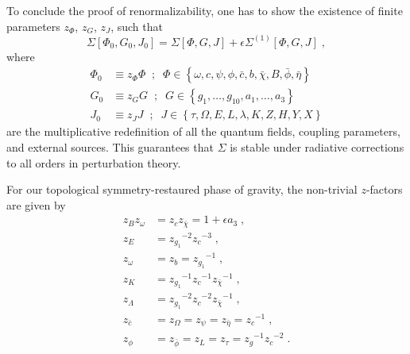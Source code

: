 \documentclass[../main.tex]{subfiles}
\begin{document}
To conclude the proof of renormalizability, one has to show the existence of finite parameters $ z_{ \Phi } $, $ z_{ G } $, $ z_{ J } $, such that
\begin{equation}
  \label{eq:multiplicative-renorm}
  \Sigma \left[ \Phi_0, G_0, J_0 \right] = \Sigma \left[ \Phi, G, J \right] + \epsilon\Sigma^{ (1) } \left[ \Phi, G, J \right] \;,
\end{equation}
where
\begin{subequations}%
  \label{eq:field-redef}
  \begin{align}
    \Phi_0 & \equiv z_{ \Phi } \Phi \;\; ; \;\; \Phi \in \left\{ \omega, c, \psi, \phi, \bar{ c }, b, \bar{ \chi }, B, \bar{ \phi }, \bar{ \eta } \right\} \\
    G_0    & \equiv z_{ G } G \;\; ; \;\; G \in \left\{ g_1, \ldots, g_{10}, a_1, \ldots, a_3 \right\}                                                     \\
    J_0    & \equiv z_{ J } J \;\; ; \;\; J \in \left\{ \tau, \Omega, E, L, \lambda, K, Z, H, Y, X \right\}
  \end{align}
\end{subequations}
are the multiplicative redefinition of all the quantum fields, coupling parameters, and external sources. This guarantees that $ \Sigma $ is stable under radiative corrections to all orders in perturbation theory.

For our topological symmetry-restaured phase of gravity, the non-trivial $z$-factors are given by
\begin{subequations}%
  \label{eq:z-factors}
  \begin{align}
    z_B z_{ \omega } & = z_c z_{\bar{\chi}} = 1 + \epsilon a_3 \;,                \\
    z_E              & = {z_{g_1}}^{-2} {z_c}^{-3} \;,                            \\
    z_{ \omega }     & = z_b = {z_{g_1}}^{-1} \;,                                 \\
    z_K              & = {z_{ g_1 }}^{-1} {z_c}^{-1} {z_{\bar{\chi}}}^{-1} \;,    \\
    z_\Lambda        & = {z_{ g_1 }}^{-2} {z_c}^{-2} {z_{\bar{\chi}}}^{-1} \;,    \\
    z_{\bar{c}}      & = z_\Omega = z_\psi = z_{\bar\eta} = {z_c}^{-1} \;,        \\
    z_\phi           & = z_{\bar{\phi}} = z_L = z_\tau = {z_g}^{-1} {z_c}^{-2}\;.
  \end{align}
\end{subequations}
\end{document}
